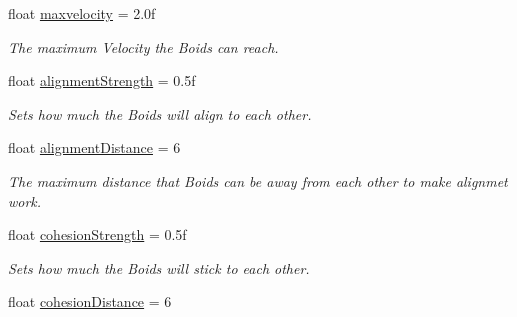 \begin{DoxyCompactItemize}
\mbox{\label{class_p_s_flocking_1_1_p_s_unit_manager_a5c4bed8aa8fd71ce724c813e0903e0fb}} 
float \hyperlink{class_p_s_flocking_1_1_p_s_unit_manager_a5c4bed8aa8fd71ce724c813e0903e0fb}{maxvelocity} = 2.\+0f
\begin{DoxyCompactList}\small\item\em The maximum Velocity the Boids can reach. \end{DoxyCompactList}\item 
\mbox{\label{class_p_s_flocking_1_1_p_s_unit_manager_a4bced9fa2de0369f6288e5d65cb0fc4b}} 
float \hyperlink{class_p_s_flocking_1_1_p_s_unit_manager_a4bced9fa2de0369f6288e5d65cb0fc4b}{alignment\+Strength} = 0.\+5f
\begin{DoxyCompactList}\small\item\em Sets how much the Boids will align to each other. \end{DoxyCompactList}\item 
\mbox{\label{class_p_s_flocking_1_1_p_s_unit_manager_aa45a0fe01bcf38a17e9e9f315455a820}} 
float \hyperlink{class_p_s_flocking_1_1_p_s_unit_manager_aa45a0fe01bcf38a17e9e9f315455a820}{alignment\+Distance} = 6
\begin{DoxyCompactList}\small\item\em The maximum distance that Boids can be away from each other to make alignmet work. \end{DoxyCompactList}\item 
\mbox{\label{class_p_s_flocking_1_1_p_s_unit_manager_a86b7428c21b9f76a78dd13221c4ff700}} 
float \hyperlink{class_p_s_flocking_1_1_p_s_unit_manager_a86b7428c21b9f76a78dd13221c4ff700}{cohesion\+Strength} = 0.\+5f
\begin{DoxyCompactList}\small\item\em Sets how much the Boids will stick to each other. \end{DoxyCompactList}\item 
\mbox{\label{class_p_s_flocking_1_1_p_s_unit_manager_a9ffaea9774cccd08c81b501dd6965fac}} 
float \hyperlink{class_p_s_flocking_1_1_p_s_unit_manager_a9ffaea9774cccd08c81b501dd6965fac}{cohesion\+Distance} = 6

\end{DoxyCompactItemize}
